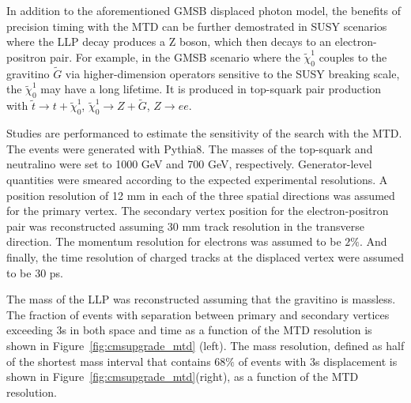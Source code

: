 In addition to the aforementioned GMSB displaced photon model, the benefits of precision timing with the MTD can be further demostrated in SUSY scenarios where the LLP decay produces a Z boson, which then decays to an electron-positron pair.
For example, in the GMSB scenario where the $\tilde{\chi}_0^1$ couples
to the gravitino $\tilde{G}$ via higher-dimension operators sensitive to the SUSY breaking scale, the $\tilde{\chi}_0^1$ may have a long lifetime. 
It is produced in top-squark pair production with 
$\tilde{t}\to t+\tilde{\chi}_0^1$, $\tilde{\chi}_0^1 \to Z+\tilde{G}$, $Z\to ee$.

Studies are performanced to estimate the sensitivity of the search with the MTD.
The events were generated with Pythia8. The masses of the top-squark and neutralino were set to 1000 GeV and 700 GeV, respectively. 
Generator-level quantities were smeared according to the expected experimental resolutions. 
A position resolution of 12 mm in each of the three spatial directions was assumed for the primary vertex.
 The secondary vertex position for the electron-positron pair was reconstructed assuming 30 mm track resolution in the transverse direction. 
The momentum resolution for electrons was assumed to be $2\%$. 
And finally, the time resolution of charged tracks at the displaced vertex were assumed to be 30 ps.

The mass of the LLP was reconstructed assuming that the gravitino is massless. The fraction of events with separation between primary and secondary
vertices exceeding 3s in both space and time as a function of the MTD resolution is shown in
Figure~\ref{fig:cmsupgrade_mtd} (left). The mass resolution, defined as half of the shortest mass interval that contains $68\%$ of events with 3s displacement is shown in Figure~\ref{fig:cmsupgrade_mtd}(right), 
as a function of the MTD resolution. 

